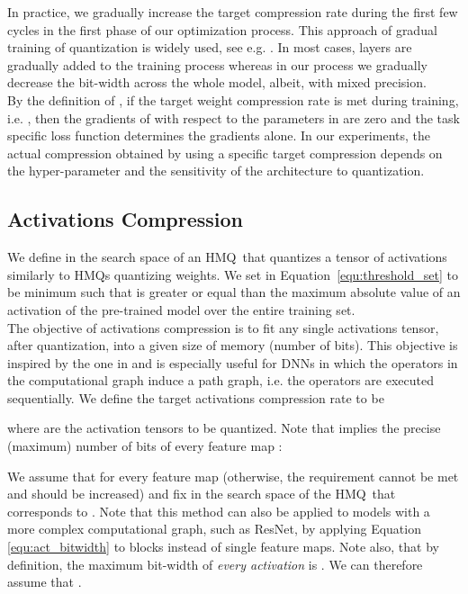 \documentclass{article}
\newcommand{\qb}{HMQ}
\begin{document}
In practice, we gradually increase the target compression rate  during the first few cycles in the first phase of our optimization process. 
This approach of gradual training of quantization is widely used, see e.g. \cite{baskin2018nice,dong2017learning,dong2019hawq,zhou2017incremental}.
In most cases, layers are gradually added to the training process whereas in our process we gradually decrease the bit-width across the whole model, albeit, with mixed precision.\\

By the definition of , if the target weight compression rate is met during training, i.e. , then the gradients of  with respect to the parameters in  are zero and the task specific loss function determines the gradients alone. 
In our experiments, the actual compression obtained by using a specific target compression  depends on the hyper-parameter  and the sensitivity of the architecture to quantization.




\subsection{Activations Compression}\label{subsec:activations_compression}
We define  in the search space  of an \qb\ that quantizes a tensor of activations similarly to \qb s quantizing weights.
We set  in \mbox{Equation \ref{equ:threshold_set}} to be minimum such that  is greater or equal than the maximum absolute value of an activation of the pre-trained model over the entire training set.\\

The objective of activations compression is to fit any single activations tensor, after quantization, into a given size of memory  (number of bits).
This objective is inspired by the one in \cite{Uhlich2020Mixed} and is especially useful for DNNs in which the operators in the computational graph induce a path graph, i.e. the operators are executed sequentially. 
We define the target activations compression rate  to be

where  are the activation tensors to be quantized.
Note that  implies the precise (maximum) number of bits  of every feature map :

We assume that  for every feature map  (otherwise, the requirement cannot be met and  should be increased) and fix  in the search space of the \qb\ that corresponds to .
Note that this method can also be applied to models with a more complex computational graph, such as ResNet, by applying Equation \ref{equ:act_bitwidth} to blocks instead of single feature maps.
Note also, that by definition, the maximum bit-width of \textit{every activation} is .
We can therefore assume that .\\
\end{document}
